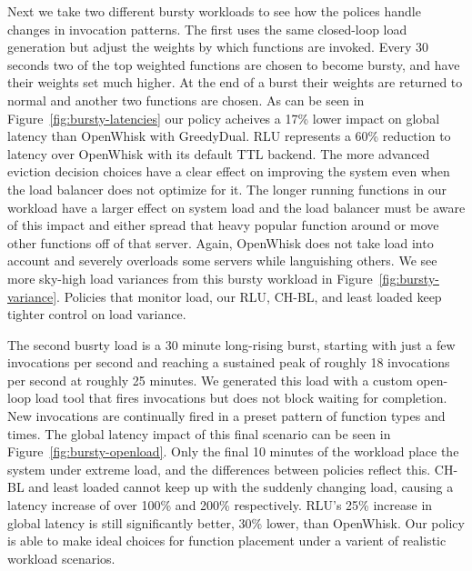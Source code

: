 Next we take two different bursty workloads to see how the polices handle changes in invocation patterns.
The first uses the same closed-loop load generation but adjust the weights by which functions are invoked.
Every 30 seconds two of the top weighted functions are chosen to become bursty, and have their weights set much higher.
At the end of a burst their weights are returned to normal and another two functions are chosen.
As can be seen in Figure~\ref{fig:bursty-latencies} our policy acheives a 17\% lower impact on global latency than OpenWhisk with GreedyDual.
RLU represents a 60\% reduction to latency over OpenWhisk with its default TTL backend.
The more advanced eviction decision choices have a clear effect on improving the system even when the load balancer does not optimize for it.
The longer running functions in our workload have a larger effect on system load and the load balancer must be aware of this impact and either spread that heavy popular function around or move other functions off of that server.
Again, OpenWhisk does not take load into account and severely overloads some servers while languishing others.
We see more sky-high load variances from this bursty workload in Figure~\ref{fig:bursty-variance}.
Policies that monitor load, our RLU, CH-BL, and least loaded keep tighter control on load variance.



The second busrty load is a 30 minute long-rising burst, starting with just a few invocations per second and reaching a sustained peak of roughly 18 invocations per second at roughly 25 minutes.
We generated this load with a custom open-loop load tool that fires invocations but does not block waiting for completion.
New invocations are continually fired in a preset pattern of function types and times.
The global latency impact of this final scenario can be seen in Figure~\ref{fig:bursty-openload}.
Only the final 10 minutes of the workload place the system under extreme load, and the differences between policies reflect this.
CH-BL and least loaded cannot keep up with the suddenly changing load, causing a latency increase of over 100\% and 200\% respectively.
RLU's 25\% increase in global latency is still significantly better, 30\% lower, than OpenWhisk.
Our policy is able to make ideal choices for function placement under a varient of realistic workload scenarios.

